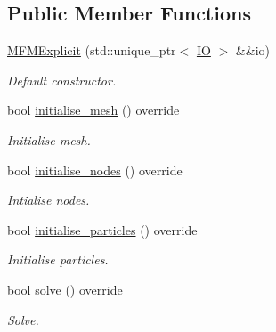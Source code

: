 \subsection*{Public Member Functions}
\begin{DoxyCompactItemize}
\item 
\hyperlink{classmfm_1_1_m_f_m_explicit_a3b1473505cf73cd6c3589439d9216025}{M\+F\+M\+Explicit} (std\+::unique\+\_\+ptr$<$ \hyperlink{classmfm_1_1_i_o}{IO} $>$ \&\&io)
\begin{DoxyCompactList}\small\item\em Default constructor. \end{DoxyCompactList}\item 
\mbox{\label{classmfm_1_1_m_f_m_explicit_a9621f2e63e9d3dd3e8f31c2fbe9e5b35}} 
bool \hyperlink{classmfm_1_1_m_f_m_explicit_a9621f2e63e9d3dd3e8f31c2fbe9e5b35}{initialise\+\_\+mesh} () override
\begin{DoxyCompactList}\small\item\em Initialise mesh. \end{DoxyCompactList}\item 
\mbox{\label{classmfm_1_1_m_f_m_explicit_a2067a261bf027b9c0a34cb94b0d55527}} 
bool \hyperlink{classmfm_1_1_m_f_m_explicit_a2067a261bf027b9c0a34cb94b0d55527}{initialise\+\_\+nodes} () override
\begin{DoxyCompactList}\small\item\em Intialise nodes. \end{DoxyCompactList}\item 
\mbox{\label{classmfm_1_1_m_f_m_explicit_a72d51d04855c10a843a654140f7f8c98}} 
bool \hyperlink{classmfm_1_1_m_f_m_explicit_a72d51d04855c10a843a654140f7f8c98}{initialise\+\_\+particles} () override
\begin{DoxyCompactList}\small\item\em Initialise particles. \end{DoxyCompactList}\item 
\mbox{\label{classmfm_1_1_m_f_m_explicit_a6d91f7c7dc52218f1a8aed74946c4391}} 
bool \hyperlink{classmfm_1_1_m_f_m_explicit_a6d91f7c7dc52218f1a8aed74946c4391}{solve} () override
\begin{DoxyCompactList}\small\item\em Solve. \end{DoxyCompactList}\end{DoxyCompactItemize}
